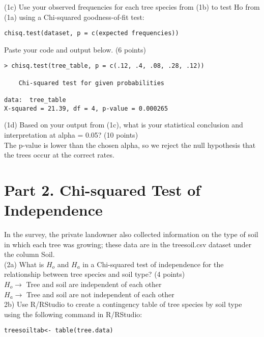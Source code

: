 \documentclass{article}
\begin{document}
(1c) Use your observed frequencies for each tree species from (1b) to test Ho from (1a) using a Chi-squared goodness-of-fit test:
\begin{center}
\begin{lstlisting}
chisq.test(dataset, p = c(expected frequencies))
\end{lstlisting}	
\end{center}


Paste your code and output below. (6 points)

\begin{center}
\begin{lstlisting}
> chisq.test(tree_table, p = c(.12, .4, .08, .28, .12))

	Chi-squared test for given probabilities

data:  tree_table
X-squared = 21.39, df = 4, p-value = 0.000265

\end{lstlisting}	
\end{center}

(1d) Based on your output from (1c), what is your statistical conclusion and interpretation at alpha = 0.05? (10 points)\\

The p-value is lower than the chosen alpha, so we reject the null hypothesis that the trees occur at the correct rates.



\section{Part 2. Chi-squared Test of Independence}

In the survey, the private landowner also collected information on the type of soil in which each tree was growing; these data are in the treesoil.csv dataset under the column Soil.\\

 

(2a) What is $H_{o}$ and $H_{a}$ in a Chi-squared test of independence for the relationship between tree species and soil type? (4 points)\\

$H_{o} \rightarrow  $ Tree and soil are independent of each other\\
$H_{a} \rightarrow  $ Tree and soil are not independent of each other\\

2b) Use R/RStudio to create a contingency table of tree species by soil type using the following command in R/RStudio:
\begin{center}
\begin{lstlisting}
treesoiltab<- table(tree.data) 
\end{lstlisting}
\end{center}
\end{document}
